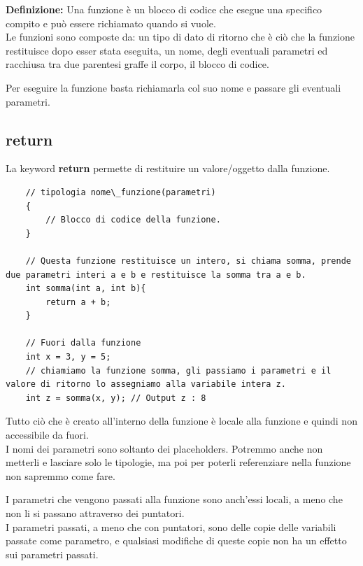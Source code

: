 \textsf{\small \textbf{Definizione: } Una funzione è un blocco di codice che esegue una specifico compito e può essere richiamato quando si vuole.} \\

\textsf{\small Le funzioni sono composte da: un tipo di dato di ritorno che è ciò che la funzione restituisce dopo esser stata eseguita, un nome, degli eventuali parametri ed racchiusa tra due parentesi graffe il corpo, il blocco di codice.}

\textsf{\small Per eseguire la funzione basta richiamarla col suo nome e passare gli eventuali parametri.} \\

\subsection{return}

\textsf{\small La keyword \textbf{return} permette di restituire un valore/oggetto dalla funzione.} \\

\begin{lstlisting}
	// tipologia nome\_funzione(parametri)
	{
		// Blocco di codice della funzione.
	}
	
	// Questa funzione restituisce un intero, si chiama somma, prende due parametri interi a e b e restituisce la somma tra a e b. 
	int somma(int a, int b){
		return a + b;
	}
	
	// Fuori dalla funzione
	int x = 3, y = 5;
	// chiamiamo la funzione somma, gli passiamo i parametri e il valore di ritorno lo assegniamo alla variabile intera z.
	int z = somma(x, y); // Output z : 8
\end{lstlisting}

\textsf{\small Tutto ciò che è creato all'interno della funzione è locale alla funzione e quindi non accessibile da fuori.} \\

\textsf{\small I nomi dei parametri sono soltanto dei placeholders. Potremmo anche non metterli e lasciare solo le tipologie, ma poi per poterli referenziare nella funzione non sapremmo come fare.}

\textsf{\small I parametri che vengono passati alla funzione sono anch'essi locali, a meno che non li si passano attraverso dei puntatori.} \\

\textsf{\small I parametri passati, a meno che con puntatori, sono delle copie delle variabili passate come parametro, e qualsiasi modifiche di queste copie non ha un effetto sui parametri passati.} \\

